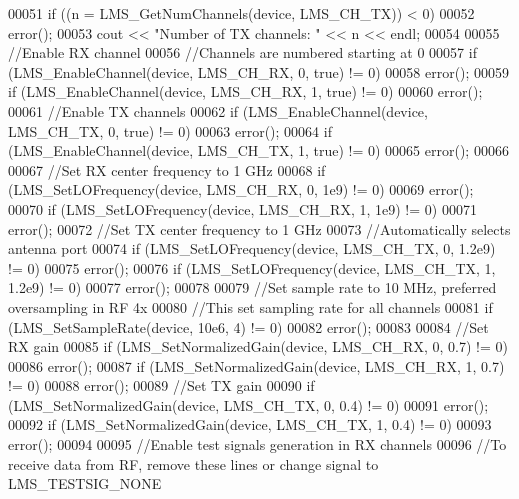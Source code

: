 \begin{DoxyCode}
00051     \textcolor{keywordflow}{if} ((n = LMS_GetNumChannels(device, LMS_CH_TX)) < 0)
00052         error();
00053     cout << \textcolor{stringliteral}{"Number of TX channels: "} << n << endl;
00054 
00055     \textcolor{comment}{//Enable RX channel}
00056     \textcolor{comment}{//Channels are numbered starting at 0}
00057     \textcolor{keywordflow}{if} (LMS_EnableChannel(device, LMS_CH_RX, 0, \textcolor{keyword}{true}) != 0)
00058         error();
00059     \textcolor{keywordflow}{if} (LMS_EnableChannel(device, LMS_CH_RX, 1, \textcolor{keyword}{true}) != 0)
00060         error();
00061     \textcolor{comment}{//Enable TX channels}
00062     \textcolor{keywordflow}{if} (LMS_EnableChannel(device, LMS_CH_TX, 0, \textcolor{keyword}{true}) != 0)
00063         error();
00064     \textcolor{keywordflow}{if} (LMS_EnableChannel(device, LMS_CH_TX, 1, \textcolor{keyword}{true}) != 0)
00065         error();
00066 
00067     \textcolor{comment}{//Set RX center frequency to 1 GHz}
00068     \textcolor{keywordflow}{if} (LMS_SetLOFrequency(device, LMS_CH_RX, 0, 1e9) != 0)
00069         error();
00070     \textcolor{keywordflow}{if} (LMS_SetLOFrequency(device, LMS_CH_RX, 1, 1e9) != 0)
00071         error();
00072     \textcolor{comment}{//Set TX center frequency to 1 GHz}
00073     \textcolor{comment}{//Automatically selects antenna port}
00074     \textcolor{keywordflow}{if} (LMS_SetLOFrequency(device, LMS_CH_TX, 0, 1.2e9) != 0)
00075         error();
00076     \textcolor{keywordflow}{if} (LMS_SetLOFrequency(device, LMS_CH_TX, 1, 1.2e9) != 0)
00077         error();
00078 
00079     \textcolor{comment}{//Set sample rate to 10 MHz, preferred oversampling in RF 4x}
00080     \textcolor{comment}{//This set sampling rate for all channels}
00081     \textcolor{keywordflow}{if} (LMS_SetSampleRate(device, 10e6, 4) != 0)
00082         error();
00083 
00084     \textcolor{comment}{//Set RX gain}
00085     \textcolor{keywordflow}{if} (LMS_SetNormalizedGain(device, LMS_CH_RX, 0, 0.7) != 0)
00086         error();
00087     \textcolor{keywordflow}{if} (LMS_SetNormalizedGain(device, LMS_CH_RX, 1, 0.7) != 0)
00088         error();
00089     \textcolor{comment}{//Set TX gain}
00090     \textcolor{keywordflow}{if} (LMS_SetNormalizedGain(device, LMS_CH_TX, 0, 0.4) != 0)
00091         error();
00092     \textcolor{keywordflow}{if} (LMS_SetNormalizedGain(device, LMS_CH_TX, 1, 0.4) != 0)
00093         error();
00094 
00095     \textcolor{comment}{//Enable test signals generation in RX channels}
00096     \textcolor{comment}{//To receive data from RF, remove these lines or change signal to LMS\_TESTSIG\_NONE}

\end{DoxyCode}

